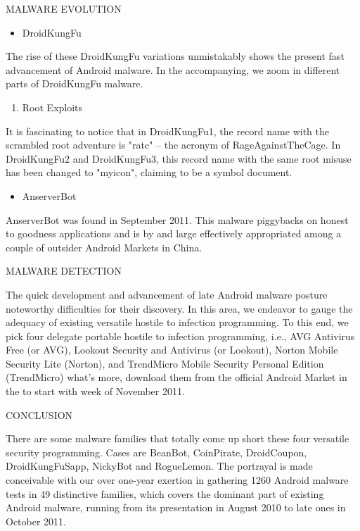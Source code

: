 \documentclass{article}
\begin{document}
MALWARE EVOLUTION
\begin{itemize}
\item DroidKungFu
\end{itemize}
\begin{center}
The rise of these DroidKungFu variations unmistakably shows the present fast advancement of Android malware. In the accompanying, we zoom in different parts of DroidKungFu malware.
\end{center}
\begin{enumerate}
\item Root Exploits
\end{enumerate}
\begin{center}
It is fascinating to notice that in DroidKungFu1, the record name with the scrambled root adventure is "ratc" – the acronym of RageAgainstTheCage. In DroidKungFu2 and DroidKungFu3, this record name with the same root misuse has been changed to "myicon", claiming to be a symbol document.
\end{center}
\begin{itemize}
\item AnserverBot
\end{itemize}
\begin{center}
AnserverBot was found in September 2011. This malware piggybacks on honest to goodness applications and is by and large effectively appropriated among a couple of outsider Android Markets in China.
\end{center}
MALWARE DETECTION
\begin{center}
The quick development and advancement of late Android malware posture noteworthy difficulties for their discovery. In this area, we endeavor to gauge the adequacy of existing versatile hostile to infection programming. To this end, we pick four delegate portable hostile to infection programming, i.e., AVG Antivirus Free (or AVG), Lookout Security and Antivirus (or Lookout), Norton Mobile Security Lite (Norton), and TrendMicro Mobile Security Personal Edition (TrendMicro) what's more, download them from the official Android Market in the to start with week of November 2011.
\end{center}
CONCLUSION
\begin{center}
There are some malware families that totally come up short these four versatile security programming. Cases are BeanBot, CoinPirate, DroidCoupon, DroidKungFuSapp, NickyBot and RogueLemon. The portrayal is made conceivable with our over one-year exertion in gathering 1260 Android malware tests in 49 distinctive families, which covers the dominant part of existing Android malware, running from its presentation in August 2010 to late ones in October 2011.
\end{center}
\end{document}
